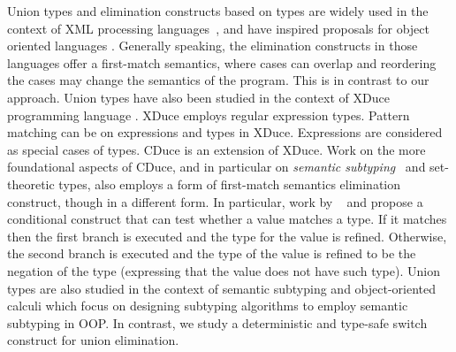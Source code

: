 \begin{comment}
\cite{freeman1991refinement} studied union types along with intersection types
in setting of refinement types for ML. Main focus of their work is to infer
more precise types of expressions, which they call
refinement types. Their work is targeted to contribute for the types
in ML and not for the expressions. Therefore, they did not define
expressions and dynamic semantics. On the contrary, our work provides
a complete calculus with type sound dynamic semantics.
\bruno{and ... Do they have an elimination construct for unions?
  If so how is that related to our work?}.
\baber{I added few more lines in Freeman citation.}
\end{comment}
Union types and elimination constructs based on types are
widely used in the context of XML processing languages~\citep{hosoya2003xduce,benzaken2003cduce},
and have inspired proposals for object oriented languages \citep{igarashi2006union}.
Generally speaking, the elimination constructs in those
languages offer a first-match semantics,
where cases can overlap and reordering the cases may change the semantics of the program.
This is in contrast to our approach.
Union types have also been studied in the context of
XDuce programming language \citep{hosoya2003xduce}. XDuce employs
regular expression types. Pattern matching can be on
expressions and types in XDuce.  Expressions are considered as special
cases of types.  CDuce
\citep{benzaken2003cduce} is an extension of XDuce.
Work on the more foundational aspects
of CDuce, and in particular on \emph{semantic subtyping}~\citep{frisch2002semantic}
and set-theoretic types,
also employs a form of first-match semantics elimination construct, though in a different form.
In particular, work by ~\cite{castagna2005gentle} and \cite{castagna2017gradual}
propose a conditional construct that can test whether a value matches a type.
If it matches then the first branch is executed and the type for the value is refined.
Otherwise, the second branch is executed and the type of the value is refined to be
the negation of the type (expressing that the value does not have such type).
Union types are also studied in the context of
semantic subtyping and object-oriented calculi
\citep{ancona2016semantic,ancona2014sound,dardha2013semantic} which
focus on designing subtyping algorithms to employ semantic subtyping in OOP.
In contrast, we study a deterministic and type-safe
switch construct for union elimination.

